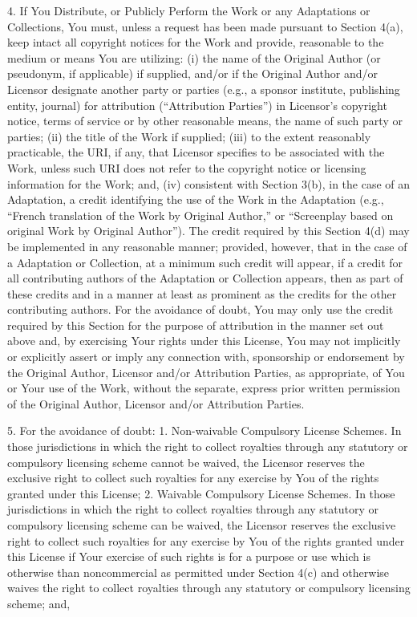 4. If You Distribute, or Publicly Perform the Work or any
Adaptations or Collections, You must, unless a request has been
made pursuant to Section 4(a), keep intact all copyright notices
for the Work and provide, reasonable to the medium or means You are
utilizing: (i) the name of the Original Author (or pseudonym, if
applicable) if supplied, and/or if the Original Author and/or
Licensor designate another party or parties (e.g., a sponsor
institute, publishing entity, journal) for attribution
(``Attribution Parties'') in Licensor's copyright notice, terms of
service or by other reasonable means, the name of such party or
parties; (ii) the title of the Work if supplied; (iii) to the
extent reasonably practicable, the URI, if any, that Licensor
specifies to be associated with the Work, unless such URI does not
refer to the copyright notice or licensing information for the
Work; and, (iv) consistent with Section 3(b), in the case of an
Adaptation, a credit identifying the use of the Work in the
Adaptation (e.g., ``French translation of the Work by Original
Author,'' or ``Screenplay based on original Work by Original
Author''). The credit required by this Section 4(d) may be
implemented in any reasonable manner; provided, however, that in
the case of a Adaptation or Collection, at a minimum such credit
will appear, if a credit for all contributing authors of the
Adaptation or Collection appears, then as part of these credits and
in a manner at least as prominent as the credits for the other
contributing authors. For the avoidance of doubt, You may only use
the credit required by this Section for the purpose of attribution
in the manner set out above and, by exercising Your rights under
this License, You may not implicitly or explicitly assert or imply
any connection with, sponsorship or endorsement by the Original
Author, Licensor and/or Attribution Parties, as appropriate, of You
or Your use of the Work, without the separate, express prior
written permission of the Original Author, Licensor and/or
Attribution Parties.

5. For the avoidance of doubt: 1. Non-waivable Compulsory License
Schemes. In those jurisdictions in which the right to collect
royalties through any statutory or compulsory licensing scheme
cannot be waived, the Licensor reserves the exclusive right to
collect such royalties for any exercise by You of the rights
granted under this License; 2. Waivable Compulsory License Schemes.
In those jurisdictions in which the right to collect royalties
through any statutory or compulsory licensing scheme can be waived,
the Licensor reserves the exclusive right to collect such royalties
for any exercise by You of the rights granted under this License if
Your exercise of such rights is for a purpose or use which is
otherwise than noncommercial as permitted under Section 4(c) and
otherwise waives the right to collect royalties through any
statutory or compulsory licensing scheme; and,

